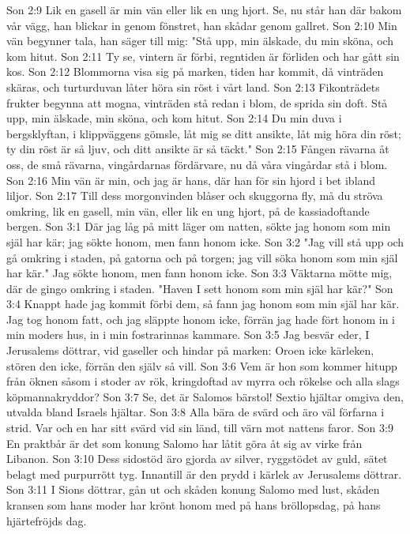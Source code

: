 Son 2:9  Lik en gasell är min vän eller lik en ung hjort. Se, nu står han där bakom vår vägg, han blickar in genom fönstret, han skådar genom gallret.
Son 2:10  Min vän begynner tala, han säger till mig: "Stå upp, min älskade, du min sköna, och kom hitut.
Son 2:11  Ty se, vintern är förbi, regntiden är förliden och har gått sin kos.
Son 2:12  Blommorna visa sig på marken, tiden har kommit, då vinträden skäras, och turturduvan låter höra sin röst i vårt land.
Son 2:13  Fikonträdets frukter begynna att mogna, vinträden stå redan i blom, de sprida sin doft. Stå upp, min älskade, min sköna, och kom hitut.
Son 2:14  Du min duva i bergsklyftan, i klippväggens gömsle, låt mig se ditt ansikte, låt mig höra din röst; ty din röst är så ljuv, och ditt ansikte är så täckt."
Son 2:15  Fången rävarna åt oss, de små rävarna, vingårdarnas fördärvare, nu då våra vingårdar stå i blom.
Son 2:16  Min vän är min, och jag är hans, där han för sin hjord i bet ibland liljor.
Son 2:17  Till dess morgonvinden blåser och skuggorna fly, må du ströva omkring, lik en gasell, min vän, eller lik en ung hjort, på de kassiadoftande bergen.
Son 3:1  Där jag låg på mitt läger om natten, sökte jag honom som min själ har kär; jag sökte honom, men fann honom icke.
Son 3:2  "Jag vill stå upp och gå omkring i staden, på gatorna och på torgen; jag vill söka honom som min själ har kär." Jag sökte honom, men fann honom icke.
Son 3:3  Väktarna mötte mig, där de gingo omkring i staden. "Haven I sett honom som min själ har kär?"
Son 3:4  Knappt hade jag kommit förbi dem, så fann jag honom som min själ har kär. Jag tog honom fatt, och jag släppte honom icke, förrän jag hade fört honom in i min moders hus, in i min fostrarinnas kammare.
Son 3:5  Jag besvär eder, I Jerusalems döttrar, vid gaseller och hindar på marken: Oroen icke kärleken, stören den icke, förrän den själv så vill.
Son 3:6  Vem är hon som kommer hitupp från öknen såsom i stoder av rök, kringdoftad av myrra och rökelse och alla slags köpmannakryddor?
Son 3:7  Se, det är Salomos bärstol! Sextio hjältar omgiva den, utvalda bland Israels hjältar.
Son 3:8  Alla bära de svärd och äro väl förfarna i strid. Var och en har sitt svärd vid sin länd, till värn mot nattens faror.
Son 3:9  En praktbår är det som konung Salomo har låtit göra åt sig av virke från Libanon.
Son 3:10  Dess sidostöd äro gjorda av silver, ryggstödet av guld, sätet belagt med purpurrött tyg. Innantill är den prydd i kärlek av Jerusalems döttrar.
Son 3:11  I Sions döttrar, gån ut och skåden konung Salomo med lust, skåden kransen som hans moder har krönt honom med på hans bröllopsdag, på hans hjärtefröjds dag.
